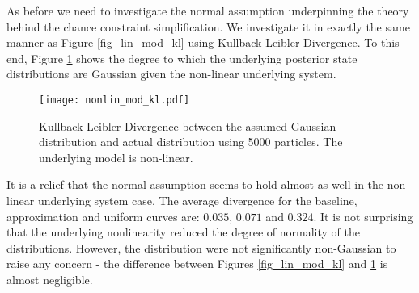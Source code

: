 As before we need to investigate the normal assumption underpinning the theory behind the chance constraint simplification. We investigate it in exactly the same manner as Figure \ref{fig_lin_mod_kl} using Kullback-Leibler Divergence. To this end, Figure \ref{fig_nonlin_mod_kl} shows the degree to which the underlying posterior state distributions are Gaussian given the non-linear underlying system.
\begin{figure}[H] 
\centering
\texttt{[image: nonlin\_mod\_kl.pdf]}
\caption{Kullback-Leibler Divergence between the assumed Gaussian distribution and actual distribution using 5000 particles. The underlying model is non-linear.}
\label{fig_nonlin_mod_kl}
\end{figure}
It is a relief that the normal assumption seems to hold almost as well in the non-linear underlying system case. The average divergence for the baseline, approximation and uniform curves are: $0.035$, $0.071$ and $0.324$. It is not surprising that the underlying nonlinearity reduced the degree of normality of the distributions. However, the distribution were not significantly non-Gaussian to raise any concern - the difference between Figures \ref{fig_lin_mod_kl} and \ref{fig_nonlin_mod_kl} is almost negligible.


